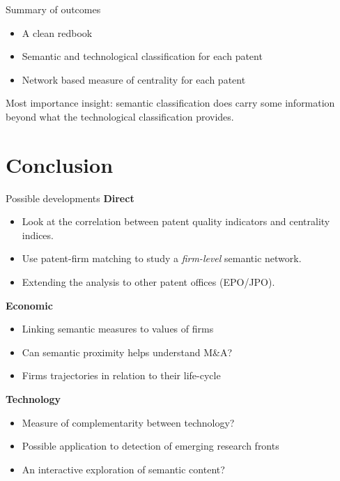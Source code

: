 \documentclass{beamer}
\begin{document}
\begin{frame}{Summary of outcomes}
    \begin{itemize}
        \item A clean redbook
        \item Semantic and technological classification for each patent
        \item Network based measure of centrality for each patent
    \end{itemize}
    
    Most importance insight: semantic classification does carry some information beyond what the technological classification provides.
\end{frame}


\section{Conclusion}
\begin{frame}{Possible developments}
\textbf{Direct}
    \begin{itemize}
        \item Look at the correlation between patent quality indicators and centrality indices.
        \item Use patent-firm matching to study a \emph{firm-level} semantic network.
        \item Extending the analysis to other patent offices (EPO/JPO).
    \end{itemize}
    \pause
\textbf{Economic}
    \begin{itemize}
        \item Linking semantic measures to values of firms
        \item Can semantic proximity helps understand M\&A?
        \item Firms trajectories in relation to their life-cycle
    \end{itemize}
    \pause
\textbf{Technology}
\begin{itemize}
    \item Measure of complementarity between technology?
    \item Possible application to detection of emerging research fronts
    \item An interactive exploration of semantic content?
\end{itemize}
\end{frame}
\end{document}
